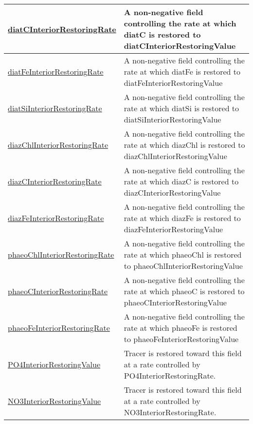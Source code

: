 {\begin{center}
\begin{longtable}{| p{2.0in} | p{4.0in} |}
    \hline
    \hyperref[subsec:var_sec_forcing_diatCInteriorRestoringRate]{diatCInteriorRestoringRate} & A non-negative field controlling the rate at which diatC is restored to diatCInteriorRestoringValue \\
    \hline
    \hyperref[subsec:var_sec_forcing_diatFeInteriorRestoringRate]{diatFeInteriorRestoringRate} & A non-negative field controlling the rate at which diatFe is restored to diatFeInteriorRestoringValue \\
    \hline
    \hyperref[subsec:var_sec_forcing_diatSiInteriorRestoringRate]{diatSiInteriorRestoringRate} & A non-negative field controlling the rate at which diatSi is restored to diatSiInteriorRestoringValue \\
    \hline
    \hyperref[subsec:var_sec_forcing_diazChlInteriorRestoringRate]{diazChlInteriorRestoringRate} & A non-negative field controlling the rate at which diazChl is restored to diazChlInteriorRestoringValue \\
    \hline
    \hyperref[subsec:var_sec_forcing_diazCInteriorRestoringRate]{diazCInteriorRestoringRate} & A non-negative field controlling the rate at which diazC is restored to diazCInteriorRestoringValue \\
    \hline
    \hyperref[subsec:var_sec_forcing_diazFeInteriorRestoringRate]{diazFeInteriorRestoringRate} & A non-negative field controlling the rate at which diazFe is restored to diazFeInteriorRestoringValue \\
    \hline
    \hyperref[subsec:var_sec_forcing_phaeoChlInteriorRestoringRate]{phaeoChlInteriorRestoringRate} & A non-negative field controlling the rate at which phaeoChl is restored to phaeoChlInteriorRestoringValue \\
    \hline
    \hyperref[subsec:var_sec_forcing_phaeoCInteriorRestoringRate]{phaeoCInteriorRestoringRate} & A non-negative field controlling the rate at which phaeoC is restored to phaeoCInteriorRestoringValue \\
    \hline
    \hyperref[subsec:var_sec_forcing_phaeoFeInteriorRestoringRate]{phaeoFeInteriorRestoringRate} & A non-negative field controlling the rate at which phaeoFe is restored to phaeoFeInteriorRestoringValue \\
    \hline
    \hyperref[subsec:var_sec_forcing_PO4InteriorRestoringValue]{PO4InteriorRestoringValue} & Tracer is restored toward this field at a rate controlled by PO4InteriorRestoringRate. \\
    \hline
    \hyperref[subsec:var_sec_forcing_NO3InteriorRestoringValue]{NO3InteriorRestoringValue} & Tracer is restored toward this field at a rate controlled by NO3InteriorRestoringRate. \\

\end{longtable}
\end{center}}
